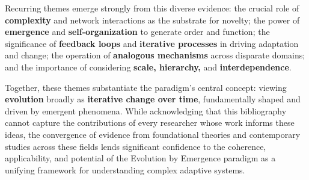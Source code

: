 Recurring themes emerge strongly from this diverse evidence: the crucial role of \textbf{complexity} and network interactions as the substrate for novelty; the power of \textbf{emergence} and \textbf{self-organization} to generate order and function; the significance of \textbf{feedback loops} and \textbf{iterative processes} in driving adaptation and change; the operation of \textbf{analogous mechanisms} across disparate domains; and the importance of considering \textbf{scale, hierarchy,} and \textbf{interdependence}.

Together, these themes substantiate the paradigm's central concept: viewing \textbf{evolution} broadly as \textbf{iterative change over time}, fundamentally shaped and driven by emergent phenomena. While acknowledging that this bibliography cannot capture the contributions of every researcher whose work informs these ideas, the convergence of evidence from foundational theories and contemporary studies across these fields lends significant confidence to the coherence, applicability, and potential of the Evolution by Emergence paradigm as a unifying framework for understanding complex adaptive systems.

